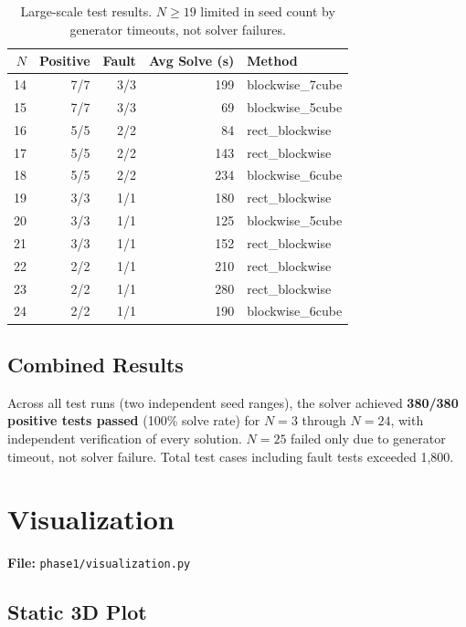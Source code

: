 \documentclass[11pt]{article}
\begin{document}
\begin{table}[H]
\centering
\begin{tabular}{@{}rrrrl@{}}
\toprule
$N$ & \textbf{Positive} & \textbf{Fault} & \textbf{Avg Solve (s)} & \textbf{Method} \\
\midrule
14 & 7/7 & 3/3 & 199 & blockwise\_7cube \\
15 & 7/7 & 3/3 & 69 & blockwise\_5cube \\
16 & 5/5 & 2/2 & 84 & rect\_blockwise \\
17 & 5/5 & 2/2 & 143 & rect\_blockwise \\
18 & 5/5 & 2/2 & 234 & blockwise\_6cube \\
19 & 3/3 & 1/1 & 180 & rect\_blockwise \\
20 & 3/3 & 1/1 & 125 & blockwise\_5cube \\
21 & 3/3 & 1/1 & 152 & rect\_blockwise \\
22 & 2/2 & 1/1 & 210 & rect\_blockwise \\
23 & 2/2 & 1/1 & 280 & rect\_blockwise \\
24 & 2/2 & 1/1 & 190 & blockwise\_6cube \\
\bottomrule
\end{tabular}
\caption{Large-scale test results. $N \geq 19$ limited in seed count by generator timeouts, not solver failures.}
\end{table}

\subsection{Combined Results}

Across all test runs (two independent seed ranges), the solver achieved \textbf{380/380 positive tests passed} (100\% solve rate) for $N=3$ through $N=24$, with independent verification of every solution. $N=25$ failed only due to generator timeout, not solver failure. Total test cases including fault tests exceeded 1,800.

\section{Visualization}

\textbf{File:} \texttt{phase1/visualization.py}

\subsection{Static 3D Plot}
\end{document}
